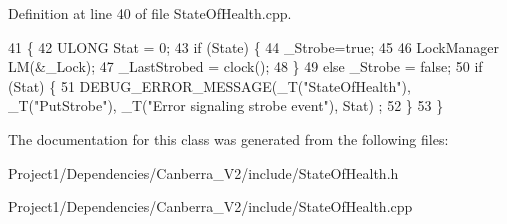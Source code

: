 Definition at line 40 of file State\+Of\+Health.\+cpp.


\begin{DoxyCode}
41 \{
42     ULONG Stat = 0;
43     \textcolor{keywordflow}{if} (State) \{
44         \_Strobe=\textcolor{keyword}{true};
45 
46         LockManager LM(&\_Lock);
47         \_LastStrobed = clock();
48     \}
49     \textcolor{keywordflow}{else} \_Strobe = \textcolor{keyword}{false};
50     \textcolor{keywordflow}{if} (Stat) \{
51         DEBUG\_ERROR\_MESSAGE(\_T(\textcolor{stringliteral}{"StateOfHealth"}), \_T(\textcolor{stringliteral}{"PutStrobe"}), \_T(\textcolor{stringliteral}{"Error signaling strobe event"}), Stat)
      ;
52     \}
53 \}
\end{DoxyCode}


The documentation for this class was generated from the following files\+:\begin{DoxyCompactItemize}
\item 
Project1/\+Dependencies/\+Canberra\+\_\+\+V2/include/State\+Of\+Health.\+h\item 
Project1/\+Dependencies/\+Canberra\+\_\+\+V2/include/State\+Of\+Health.\+cpp\end{DoxyCompactItemize}
